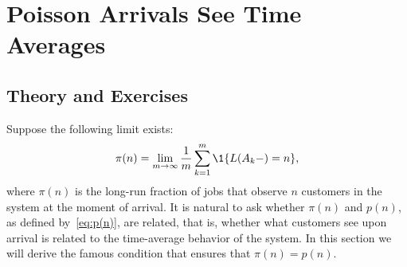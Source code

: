 \section{Poisson Arrivals See Time Averages}
\label{sec:poisson-arrivals-see}

\subsection*{Theory and Exercises}


Suppose the following limit exists:
\begin{equation}\label{eq:jaap}
  \pi(n) 
= \lim_{m\to\infty} 
\frac1m\sum_{k=1}^m \1{L(A_k-) = n},
\end{equation}
where $\pi(n)$ is the long-run fraction of jobs that observe $n$
customers in the system at the moment of arrival.  It is natural to
ask whether $\pi(n)$ and $p(n)$, as defined by~\eqref{eq:p(n)}, are related, that is, whether what
customers see upon arrival is related to the time-average behavior of
the system. In this section we will derive the famous  condition  that ensures that  $\pi(n)=p(n)$. 


\begin{comment}
\begin{hint}
Check the definitions of $Y(0,t)$, $Y(1,t)$, $A(0,t)$ and so on. Make a drawing of $Y(0, t)$ and $Y(1,t)$ as functions of $t$. 
\end{hint}
  \begin{solution}
 $A(t)=\lfloor t\rfloor$ provided the unit of $t$ is in
  hours. $A(0,t)=A(t)$ and $A(n,t)=0$ for $n>0$.  Next, for $Y(0,t)$ we define, for notational ease, the fractional part of $t$ as $\{t\} = t - \lfloor t \rfloor$. Then,
  \begin{align*}
    Y(0,t)&= \frac 1{60} \lfloor t \rfloor + \{t\} \1{ \{t\} \in[59/60, 1)} \approx \frac{1}{60}t, \\
    Y(1,t)&= \frac{59}{60} \lfloor t \rfloor + \{t\} \1{\{t\}\in[0,59/60)} \approx \frac{59}{60}t. \\
\lambda(0) &= \lim_t \frac{A(0,t)}{Y(0,t)} = \lim_t \frac{t}{t/60} = 60, \\
\lambda(1) &= \lim_t \frac{A(1,t)}{Y(1,t)} = \lim_t\frac{0}{59/60 t} = 0 \\
\lambda(n) &= 0, \quad n\geq 1. \\
\lambda &= \lim_t \frac{A(t)}t  = 1 \\
p(0)  &= \frac{1}{60}, \\
p(1)  &= \frac{59}{60}, \\
\rho  &= \frac{59}{60}, \\
\pi(0)  &= 1. \\
  \end{align*}
  There is no queue so $\E{L_Q} = 0$, but $\E L = \rho$.  The queue
  length as observed by customers is equal to 0, because jobs only
  arrive when the server is free.
  \end{solution}
\end{exercise}
  \end{comment}

